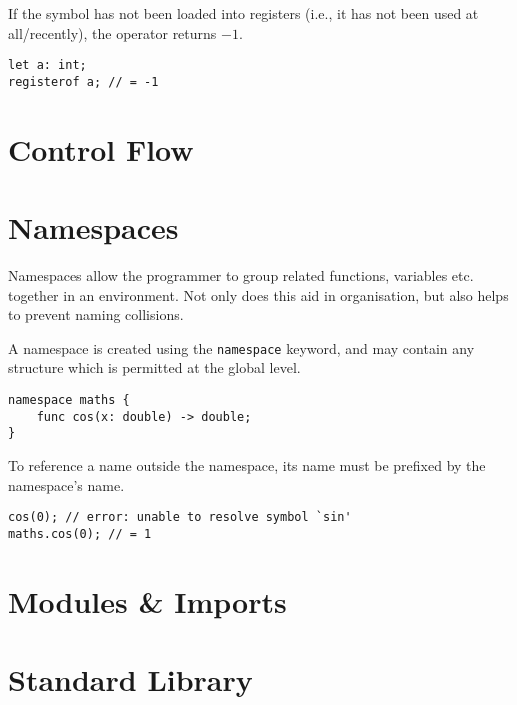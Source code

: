 \documentclass{article}
\begin{document}
    If the symbol has not been loaded into registers (i.e., it has not been used at all/recently), the operator returns \(-1\).

    \begin{lstlisting}[language=CustomLang]
let a: int;
registerof a; // = -1
    \end{lstlisting}

    \section{Control Flow}

    \section{Namespaces}

    Namespaces allow the programmer to group related functions, variables etc. together in an environment.
    Not only does this aid in organisation, but also helps to prevent naming collisions.

    A namespace is created using the \texttt{namespace} keyword, and may contain any structure which is permitted at the global level.

    \begin{lstlisting}[language=CustomLang]
namespace maths {
    func cos(x: double) -> double;
}
    \end{lstlisting}

    To reference a name outside the namespace, its name must be prefixed by the namespace's name.

    \begin{lstlisting}[language=CustomLang]
cos(0); // error: unable to resolve symbol `sin'
maths.cos(0); // = 1
    \end{lstlisting}

    \section{Modules \& Imports}

    \section{Standard Library}
\end{document}
